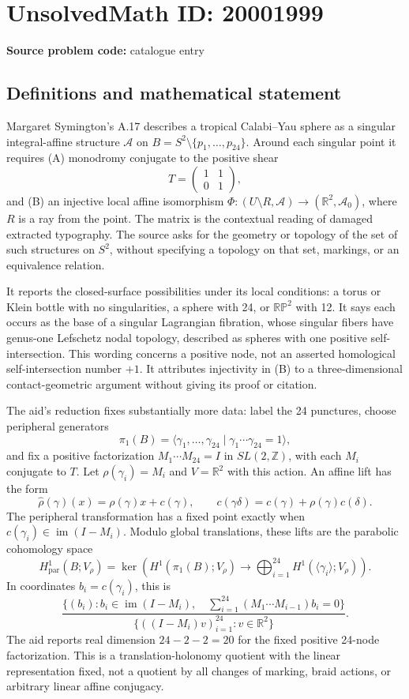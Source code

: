 \documentclass[11pt]{article}
\newcommand{\Z}{\mathbb{Z}}
\newcommand{\R}{\mathbb{R}}
\newcommand{\PP}{\mathbb{P}}
\begin{document}
\section*{UnsolvedMath ID: 20001999}
\textbf{Source problem code:} catalogue entry
\subsection{Definitions and mathematical statement}
Margaret Symington's A.17 describes a tropical Calabi--Yau sphere as a singular integral-affine structure \(\mathcal A\) on \(B=S^2\setminus\{p_1,\ldots,p_{24}\}\). Around each singular point it requires (A) monodromy conjugate to the positive shear
\[
 T=\begin{pmatrix}1&1\\0&1\end{pmatrix},
\]
and (B) an injective local affine isomorphism \(\Phi:(U\setminus R,\mathcal A)\to(\R^2,\mathcal A_0)\), where \(R\) is a ray from the point. The matrix is the contextual reading of damaged extracted typography. The source asks for the geometry or topology of the set of such structures on \(S^2\), without specifying a topology on that set, markings, or an equivalence relation.

It reports the closed-surface possibilities under its local conditions: a torus or Klein bottle with no singularities, a sphere with 24, or \(\R\PP^2\) with 12. It says each occurs as the base of a singular Lagrangian fibration, whose singular fibers have genus-one Lefschetz nodal topology, described as spheres with one positive self-intersection. This wording concerns a positive node, not an asserted homological self-intersection number \(+1\). It attributes injectivity in (B) to a three-dimensional contact-geometric argument without giving its proof or citation.

The aid's reduction fixes substantially more data: label the 24 punctures, choose peripheral generators
\[
 \pi_1(B)=\langle\gamma_1,\ldots,\gamma_{24}\mid\gamma_1\cdots\gamma_{24}=1\rangle,
\]
and fix a positive factorization \(M_1\cdots M_{24}=I\) in \(SL(2,\Z)\), with each \(M_i\) conjugate to \(T\). Let \(\rho(\gamma_i)=M_i\) and \(V=\R^2\) with this action. An affine lift has the form
\[
 \widehat\rho(\gamma)(x)=\rho(\gamma)x+c(\gamma),\qquad
 c(\gamma\delta)=c(\gamma)+\rho(\gamma)c(\delta).
\]
The peripheral transformation has a fixed point exactly when
\(c(\gamma_i)\in\operatorname{im}(I-M_i)\). Modulo global translations, these lifts are the parabolic cohomology space
\[
 H^1_{\mathrm{par}}(B;V_\rho)=
 \ker\left(H^1(\pi_1(B);V_\rho)\longrightarrow
 \bigoplus_{i=1}^{24}H^1(\langle\gamma_i\rangle;V_\rho)\right).
\]
In coordinates \(b_i=c(\gamma_i)\), this is
\[
 \frac{\{(b_i): b_i\in\operatorname{im}(I-M_i),\quad
 \sum_{i=1}^{24}(M_1\cdots M_{i-1})b_i=0\}}
 {\{((I-M_i)v)_{i=1}^{24}:v\in\R^2\}}.
\]
The aid reports real dimension \(24-2-2=20\) for the fixed positive 24-node factorization. This is a translation-holonomy quotient with the linear representation fixed, not a quotient by all changes of marking, braid actions, or arbitrary linear affine conjugacy.
\end{document}

